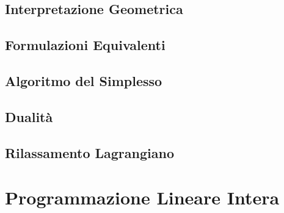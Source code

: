 \subsection{Interpretazione Geometrica}

\subsection{Formulazioni Equivalenti}

\subsection{Algoritmo del Simplesso}

\subsection{Dualità}

\subsection{Rilassamento Lagrangiano}

\section{Programmazione Lineare Intera}
